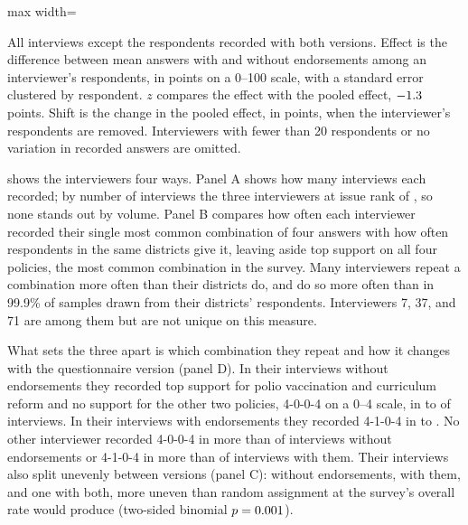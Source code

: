 \documentclass[11pt,letterpaper]{article}
\newcommand{\TableStyle}{\normalsize\setlength{\tabcolsep}{6pt}\renewcommand{\arraystretch}{1}}
\newcommand{\tablenote}[1]{\par\smallskip\begin{minipage}{\linewidth}\footnotesize #1\end{minipage}}
\begin{document}
\begin{table}[htbp]
\centering\TableStyle
\caption{Interviewer-specific treatment effects furthest from the pooled effect}
\label{tab:interviewer_effects}
\begin{adjustbox}{max width=\linewidth}

\end{adjustbox}
\tablenote{All interviews except the \MixedRespondents{} respondents recorded with both versions. Effect is the difference between mean answers with and without endorsements among an interviewer's respondents, in points on a 0--100 scale, with a standard error clustered by respondent. $z$ compares the effect with the pooled effect, $-1.3{}$ points. Shift is the change in the pooled effect, in points, when the interviewer's respondents are removed. Interviewers with fewer than 20 respondents or no variation in recorded answers are omitted.}
\end{table}

 shows the \InterviewerCount{} interviewers four ways. Panel A shows how many interviews each recorded; by number of interviews the three interviewers at issue rank \SuspectVolumeRanks{} of \InterviewerCount{}, so none stands out by volume. Panel B compares how often each interviewer recorded their single most common combination of four answers with how often respondents in the same districts give it, leaving aside top support on all four policies, the most common combination in the survey. Many interviewers repeat a combination more often than their districts do, and \FlaggedCount{} do so more often than in 99.9\% of samples drawn from their districts' respondents. Interviewers 7, 37, and 71 are among them but are not unique on this measure.

What sets the three apart is which combination they repeat and how it changes with the questionnaire version (panel D). In their interviews without endorsements they recorded top support for polio vaccination and curriculum reform and no support for the other two policies, 4-0-0-4 on a 0--4 scale, in \SuspectBlockMin{} to \SuspectBlockMax{} of interviews. In their interviews with endorsements they recorded 4-1-0-4 in \SuspectBlockEndorsedMin{} to \SuspectBlockEndorsedMax{}. No other interviewer recorded 4-0-0-4 in more than \OtherBlockMax{} of interviews without endorsements or 4-1-0-4 in more than \OtherBlockEndorsedMax{} of interviews with them. Their interviews also split unevenly between versions (panel C): \SuspectControl{} without endorsements, \SuspectEndorsed{} with them, and one with both, more uneven than random assignment at the survey's overall rate would produce (two-sided binomial $p=0.001{}$).
\end{document}
